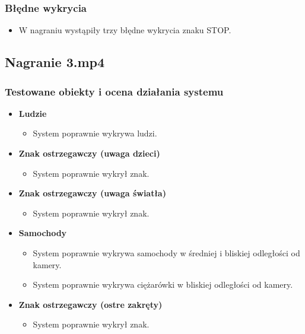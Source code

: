 \subsubsection*{Błędne wykrycia}
\begin{itemize}
    \item W nagraniu wystąpiły trzy błędne wykrycia znaku STOP.
\end{itemize}

\subsection{Nagranie 3.mp4}
\subsubsection*{Testowane obiekty i ocena działania systemu}
\begin{itemize}
    \item \textbf{Ludzie}
          \begin{itemize}
              \item System poprawnie wykrywa ludzi.
          \end{itemize}
    \item \textbf{Znak ostrzegawczy (uwaga dzieci)}
          \begin{itemize}
              \item System poprawnie wykrył znak.
          \end{itemize}
    \item \textbf{Znak ostrzegawczy (uwaga światła)}
          \begin{itemize}
              \item System poprawnie wykrył znak.
          \end{itemize}
    \item \textbf{Samochody}
          \begin{itemize}
              \item System poprawnie wykrywa samochody w średniej i bliskiej odległości od kamery.
              \item System poprawnie wykrywa ciężarówki w bliskiej odległości od kamery.
          \end{itemize}
    \item \textbf{Znak ostrzegawczy (ostre zakręty)}
          \begin{itemize}
              \item System poprawnie wykrył znak.
          \end{itemize}
\end{itemize}

